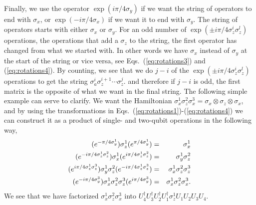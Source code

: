 Finally, we use the operator $\exp(i\pi/4\sigma_y)$ if we want the
string of operators to end with $\sigma_x$, or  $\exp(-i\pi/4\sigma_x)$
if we want it to end with $\sigma_y$.
The string of operators starts with either $\sigma_x$ or $\sigma_y$. For an odd
number of $\exp(\pm i\pi/4\sigma_z^i \sigma_z^l)$ operations, the
operations that add a $\sigma_z$ to the string, the first
operator has changed from what we started with. In other words we have
$\sigma_x$ instead of $\sigma_y$ at the start of the string or vice
versa, see Eqs.~(\ref{eq:rotations3}) and (\ref{eq:rotations4}).
By counting, we see that we do 
$j-i$ of the  $\exp(\pm i\pi/4\sigma_z^i \sigma_z^l)$
operations to get the string
$\sigma_a^i\sigma_z^{i+1}\cdots\sigma_z^j$. 
and therefore if $j-i$ is odd, the first matrix is the opposite of
what we want in the final string.
The following simple example can serve to clarify.
We want the Hamiltonian
$\sigma_x^1\sigma_z^2\sigma_x^3= \sigma_x\otimes \sigma_z \otimes
\sigma_x$, and by using the transformations in
Eqs.~(\ref{eq:rotations1})-(\ref{eq:rotations4}) we can construct it
as a product of single- and two-qubit operations in the following way,
\begin{eqnarray}
(e^{-\pi/4\sigma_y^1}) \sigma_z^1 (e^{\pi/4\sigma_y^1})&=&\sigma_x^1
\notag\\
 (e^{-i\pi/4\sigma_z^1\sigma_z^2}) \sigma_x^1
 (e^{i\pi/4\sigma_z^1\sigma_z^2}) & = & \sigma_y^1\sigma_z^2 \notag \\
(e^{i\pi/4\sigma_z^1\sigma_z^3}) \sigma_y^1\sigma_z^2
(e^{-i\pi/4\sigma_z^1\sigma_z^3}) & = & \sigma_x^1\sigma_z^2 \sigma_z^3
\notag\\
(e^{-i\pi/4\sigma_y^3}) \sigma_x^1\sigma_z^2 \sigma_z^3
(e^{i\pi/4\sigma_y^3}) & =& \sigma_x^1\sigma_z^2\sigma_x^3.
\end{eqnarray}
We see that we have factorized $\sigma_x^1\sigma_z^2\sigma_x^3$ into
$U_4^\dag U_3^\dag U_2^\dag U_1^\dag \sigma_z^1 U_1 U_2 U_3U_4$.



